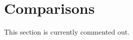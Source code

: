 \documentclass[journal]{article}
\begin{document}
 \section{Comparisons}
    This section is currently commented out.
% 
% 
%  
%  
%  
%  
%  
\end{document}
